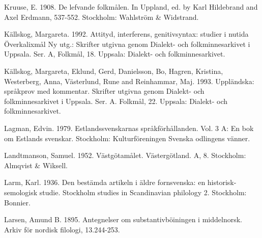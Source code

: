 \begin{styleBodytextC}
Kruuse, E.  1908. De lefvande folkmålen. In Uppland, ed. by Karl Hildebrand and Axel Erdmann, 537-552. Stockholm: Wahlström \& Widstrand.

\end{styleBodytextC}

\begin{styleBodytextC}
Källskog, Margareta. 1992. Attityd, interferens, genitivsyntax: studier i nutida Överkalixmål Ny utg.: Skrifter utgivna genom Dialekt- och folkminnesarkivet i Uppsala. Ser. A, Folkmål, 18. Uppsala: Dialekt- och folkminnesarkivet.

\end{styleBodytextC}

\begin{styleBodytextC}
Källskog, Margareta, Eklund, Gerd, Danielsson, Bo, Hagren, Kristina, Westerberg, Anna, Västerlund, Rune and Reinhammar, Maj. 1993. Uppländska: språkprov med kommentar. Skrifter utgivna genom Dialekt- och folkminnesarkivet i Uppsala. Ser. A. Folkmål, 22. Uppsala: Dialekt- och folkminnesarkivet.

\end{styleBodytextC}

\begin{styleBodytextC}
Lagman, Edvin. 1979. Estlandssvenskarnas språkförhållanden. Vol. 3 A: En bok om Estlands svenskar. Stockholm: Kulturföreningen Svenska odlingens vänner.

\end{styleBodytextC}

\begin{styleBodytextC}
Landtmanson, Samuel. 1952. Västgötamålet. Västergötland. A, 8. Stockholm: Almqvist \& Wiksell.

\end{styleBodytextC}

\begin{styleBodytextC}
Larm, Karl. 1936. Den bestämda artikeln i äldre fornsvenska: en historisk-semologisk studie. Stockholm studies in Scandinavian philology 2. Stockholm: Bonnier.

\end{styleBodytextC}

\begin{styleBodytextC}
Larsen, Amund B. 1895. Antegnelser om substantivböiningen i middelnorsk. Arkiv för nordisk filologi, 13.244-253.

\end{styleBodytextC}

